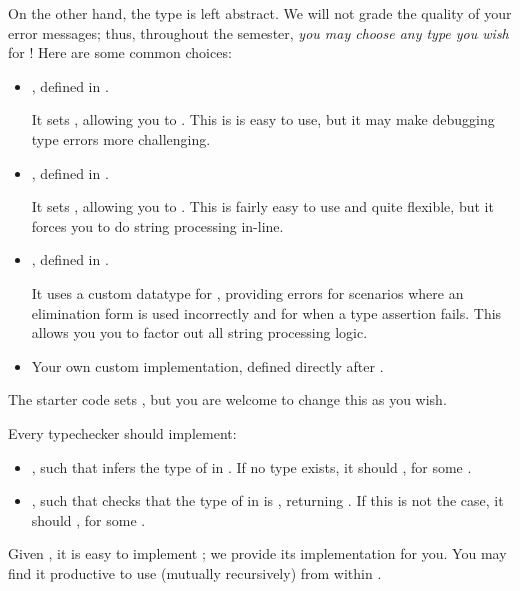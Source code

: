 \documentclass[11pt]{article}
\begin{document}
On the other hand, the type  is left abstract.
We will not grade the quality of your error messages; thus, throughout the semester, \emph{you may choose any type you wish} for !
Here are some common choices:
\begin{itemize}
  \item
    , defined in .

    It sets , allowing you to .
    This is is easy to use, but it may make debugging type errors more challenging.

  \item
    , defined in .

    It sets , allowing you to .
    This is fairly easy to use and quite flexible, but it forces you to do string processing in-line.

  \item
    , defined in .

    It uses a custom datatype for , providing errors for scenarios where an elimination form is used incorrectly and for when a type assertion fails.
    This allows you you to factor out all string processing logic.

  \item
    Your own custom implementation, defined directly after .
\end{itemize}
The starter code sets , but you are welcome to change this as you wish.

Every typechecker should implement:
\begin{itemize}
  \item
    , such that  infers the type of  in .
    If no type exists, it should , for some .

  \item
    , such that  checks that the type of  in  is , returning \code{()}.
    If this is not the case, it should , for some .
\end{itemize}
Given , it is easy to implement ; we provide its implementation for you.
You may find it productive to use  (mutually recursively) from within .
\end{document}
